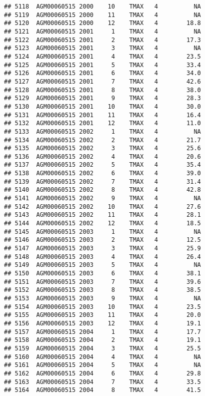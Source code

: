 \documentclass{article}\usepackage[]{graphicx}\usepackage[]{color}
\makeatletter
\newenvironment{kframe}{%
 \def\at@end@of@kframe{}%
 \ifinner\ifhmode%
  \def\at@end@of@kframe{\end{minipage}}%
  \begin{minipage}{\columnwidth}%
 \fi\fi%
 \def\FrameCommand##1{\hskip\@totalleftmargin \hskip-\fboxsep
 \colorbox{shadecolor}{##1}\hskip-\fboxsep
     \hskip-\linewidth \hskip-\@totalleftmargin \hskip\columnwidth}%
 \MakeFramed {\advance\hsize-\width
   \@totalleftmargin\z@ \linewidth\hsize
   \@setminipage}}%
 {\par\unskip\endMakeFramed%
 \at@end@of@kframe}
\newenvironment{knitrout}{}{} %
\makeatother
\begin{document}
\begin{knitrout}
\begin{kframe}
\begin{verbatim}
## 5118  AGM00060515 2000    10    TMAX   4          NA
## 5119  AGM00060515 2000    11    TMAX   4          NA
## 5120  AGM00060515 2000    12    TMAX   4        18.8
## 5121  AGM00060515 2001     1    TMAX   4          NA
## 5122  AGM00060515 2001     2    TMAX   4        17.3
## 5123  AGM00060515 2001     3    TMAX   4          NA
## 5124  AGM00060515 2001     4    TMAX   4        23.5
## 5125  AGM00060515 2001     5    TMAX   4        33.4
## 5126  AGM00060515 2001     6    TMAX   4        34.0
## 5127  AGM00060515 2001     7    TMAX   4        42.6
## 5128  AGM00060515 2001     8    TMAX   4        38.0
## 5129  AGM00060515 2001     9    TMAX   4        28.3
## 5130  AGM00060515 2001    10    TMAX   4        30.0
## 5131  AGM00060515 2001    11    TMAX   4        16.4
## 5132  AGM00060515 2001    12    TMAX   4        11.0
## 5133  AGM00060515 2002     1    TMAX   4          NA
## 5134  AGM00060515 2002     2    TMAX   4        21.7
## 5135  AGM00060515 2002     3    TMAX   4        25.6
## 5136  AGM00060515 2002     4    TMAX   4        20.6
## 5137  AGM00060515 2002     5    TMAX   4        35.4
## 5138  AGM00060515 2002     6    TMAX   4        39.0
## 5139  AGM00060515 2002     7    TMAX   4        31.4
## 5140  AGM00060515 2002     8    TMAX   4        42.8
## 5141  AGM00060515 2002     9    TMAX   4          NA
## 5142  AGM00060515 2002    10    TMAX   4        27.6
## 5143  AGM00060515 2002    11    TMAX   4        28.1
## 5144  AGM00060515 2002    12    TMAX   4        18.5
## 5145  AGM00060515 2003     1    TMAX   4          NA
## 5146  AGM00060515 2003     2    TMAX   4        12.5
## 5147  AGM00060515 2003     3    TMAX   4        25.9
## 5148  AGM00060515 2003     4    TMAX   4        26.4
## 5149  AGM00060515 2003     5    TMAX   4          NA
## 5150  AGM00060515 2003     6    TMAX   4        38.1
## 5151  AGM00060515 2003     7    TMAX   4        39.6
## 5152  AGM00060515 2003     8    TMAX   4        38.5
## 5153  AGM00060515 2003     9    TMAX   4          NA
## 5154  AGM00060515 2003    10    TMAX   4        23.5
## 5155  AGM00060515 2003    11    TMAX   4        20.0
## 5156  AGM00060515 2003    12    TMAX   4        19.1
## 5157  AGM00060515 2004     1    TMAX   4        17.7
## 5158  AGM00060515 2004     2    TMAX   4        19.1
## 5159  AGM00060515 2004     3    TMAX   4        25.5
## 5160  AGM00060515 2004     4    TMAX   4          NA
## 5161  AGM00060515 2004     5    TMAX   4          NA
## 5162  AGM00060515 2004     6    TMAX   4        29.8
## 5163  AGM00060515 2004     7    TMAX   4        33.5
## 5164  AGM00060515 2004     8    TMAX   4        41.5

\end{verbatim}
\end{kframe}
\end{knitrout}
\end{document}
